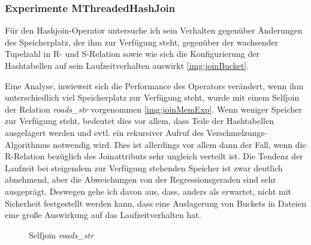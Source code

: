 \documentclass[a4paper,12pt,twoside]{article}
\newcommand{\Fb}[1]{\textit{#1}} %
\begin{document}
{\subsubsection{Experimente MThreadedHashJoin}
\label{exp:hash}

Für den Hashjoin-Operator untersuche ich sein Verhalten gegenüber Änderungen des Speicherplatz, der ihm zur Verfügung steht, gegenüber der wachsender Tupelzahl in R- und S-Relation sowie wie sich die Konfigurierung der Hashtabellen auf sein Laufzeitverhalten auswirkt \autoref{img:joinBucket}.

Eine Analyse, inwieweit sich die Performance des Operators verändert, wenn ihm unterschiedlich viel Speicherplatz zur Verfügung steht, wurde mit einem Selfjoin der Relation \Fb{roads\_str} vorgenommen \autoref{img:joinMemExp}. Wenn weniger Speicher zur Verfügung steht, bedeutet dies vor allem, dass Teile der Hashtabellen ausgelagert werden und evtl. ein rekursiver Aufruf des Verschmelzungs-Algorithmus notwendig wird. Dies ist allerdings vor allem dann der Fall, wenn die R-Relation bezüglich des Joinattributs sehr ungleich verteilt ist. Die Tendenz der Laufzeit bei steigendem zur Verfügung stehenden Speicher ist zwar deutlich abnehmend, aber die Abweichungen von der Regressionsgeraden sind sehr ausgeprägt. Deswegen gehe ich davon aus, dass, anders als erwartet, nicht mit Sicherheit festgestellt werden kann, dass eine Auslagerung von Buckets in Dateien eine große Auswirkung auf das Laufzeitverhalten hat.

\begin{figure}
	\centering
	\qquad	
	\caption{Selfjoin \Fb{roads\_str}}
	\label{img:joinExpAllg}
\end{figure}

}
\end{document}
